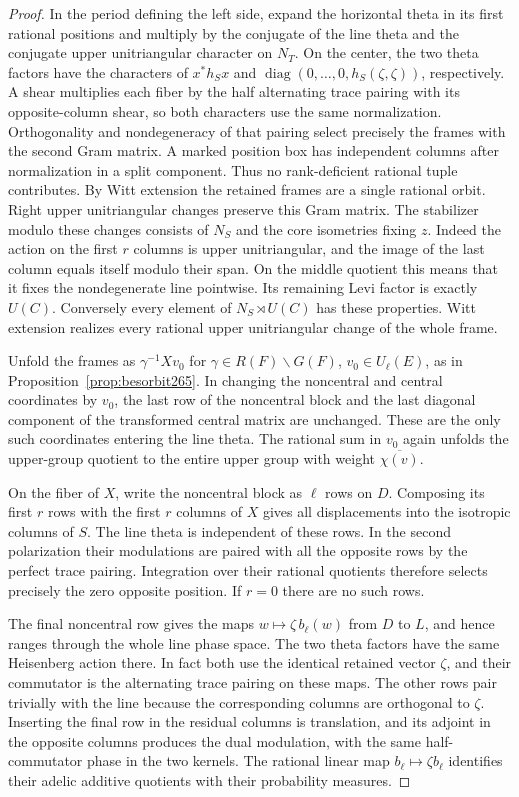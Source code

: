\documentclass[a4paper,11pt]{article}
\theoremstyle{definition}
\theoremstyle{remark}
\numberwithin{equation}{section}
\begin{document}
\begin{proof}
In the period defining the left side, expand the horizontal
theta in its first rational positions and multiply by the
conjugate of the line theta and the conjugate upper
unitriangular character on \(N_T\). On the center, the two
theta factors have the characters of \(x^*h_Sx\) and
\(\operatorname{diag}(0,\ldots,0,h_S(\zeta,\zeta))\),
respectively. A shear multiplies each fiber by the half
alternating trace pairing with its opposite-column shear,
so both characters use the same normalization. Orthogonality
and nondegeneracy of that pairing select precisely the frames
with the second Gram matrix. A marked position box has
independent columns after normalization in a split component.
Thus no rank-deficient rational tuple contributes. By Witt
extension the retained frames are a single rational orbit.
Right upper unitriangular changes preserve this Gram matrix.
The stabilizer modulo these changes consists of \(N_S\) and
the core isometries fixing \(z\). Indeed the action on the
first \(r\) columns is upper unitriangular, and the image of
the last column equals itself modulo their span. On the
middle quotient this means that it fixes the nondegenerate
line pointwise. Its remaining Levi factor is exactly \(U(C)\).
Conversely every element of \(N_S\rtimes U(C)\) has these
properties. Witt extension realizes every rational upper
unitriangular change of the whole frame.

Unfold the frames as \(\gamma^{-1}Xv_0\) for
\(\gamma\in R(F)\backslash G(F)\), \(v_0\in U_\ell(E)\), as
in Proposition~\ref{prop:besorbit265}. In changing the
noncentral and central coordinates by \(v_0\), the last row
of the noncentral block and the last diagonal component of
the transformed central matrix are unchanged. These are the
only such coordinates entering the line theta. The rational
sum in \(v_0\) again unfolds the upper-group quotient to the
entire upper group with weight \(\overline{\chi(v)}\).

On the fiber of \(X\), write the noncentral block as
\(\ell\) rows on \(D\). Composing its first \(r\) rows with
the first \(r\) columns of \(X\) gives all displacements into
the isotropic columns of \(S\). The line theta is independent
of these rows. In the second polarization their modulations
are paired with all the opposite rows by the perfect trace
pairing. Integration over their rational quotients therefore
selects precisely the zero opposite position. If \(r=0\)
there are no such rows.

The final noncentral row gives the maps \(w\mapsto
\zeta\,b_\ell(w)\) from \(D\) to \(L\), and hence ranges
through the whole line phase space. The two theta factors
have the same Heisenberg action there. In fact both use the
identical retained vector \(\zeta\), and their commutator is
the alternating trace pairing on these maps. The other rows
pair trivially with the line because the corresponding
columns are orthogonal to \(\zeta\). Inserting the final row
in the residual columns is translation, and its adjoint in
the opposite columns produces the dual modulation, with the
same half-commutator phase in the two kernels. The rational
linear map \(b_\ell\mapsto\zeta b_\ell\) identifies their
adelic additive quotients with their probability measures.


\end{proof}
\end{document}
